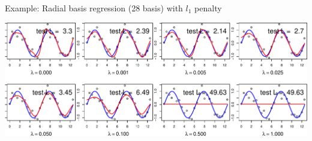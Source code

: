 \documentclass[ignorenonframetext,aspectratio=169]{beamer}
\begin{document}
\begin{frame}{Example: Radial basis regression (28 basis) with \(l_1\)
penalty}
\protect\hypertarget{example-radial-basis-regression-28-basis-with-l_1-penalty}{}

\begin{center}\includegraphics[width=1\linewidth]{lecture10_files/figure-beamer/unnamed-chunk-24-1} \end{center}

\end{frame}
\end{document}
